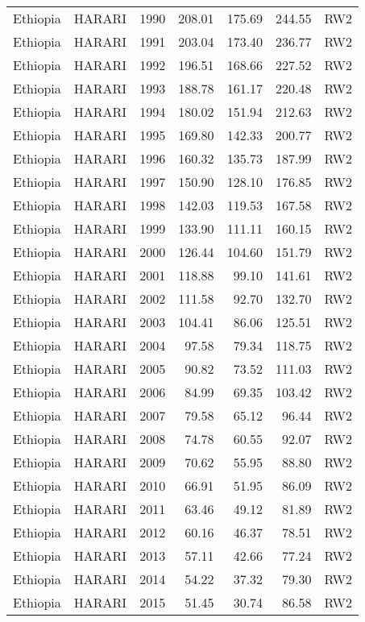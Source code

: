 \begin{longtable}{lllrrrl}
  Ethiopia & HARARI & 1990 & 208.01 & 175.69 & 244.55 & RW2 \\ 
  Ethiopia & HARARI & 1991 & 203.04 & 173.40 & 236.77 & RW2 \\ 
  Ethiopia & HARARI & 1992 & 196.51 & 168.66 & 227.52 & RW2 \\ 
  Ethiopia & HARARI & 1993 & 188.78 & 161.17 & 220.48 & RW2 \\ 
  Ethiopia & HARARI & 1994 & 180.02 & 151.94 & 212.63 & RW2 \\ 
  Ethiopia & HARARI & 1995 & 169.80 & 142.33 & 200.77 & RW2 \\ 
  Ethiopia & HARARI & 1996 & 160.32 & 135.73 & 187.99 & RW2 \\ 
  Ethiopia & HARARI & 1997 & 150.90 & 128.10 & 176.85 & RW2 \\ 
  Ethiopia & HARARI & 1998 & 142.03 & 119.53 & 167.58 & RW2 \\ 
  Ethiopia & HARARI & 1999 & 133.90 & 111.11 & 160.15 & RW2 \\ 
  Ethiopia & HARARI & 2000 & 126.44 & 104.60 & 151.79 & RW2 \\ 
  Ethiopia & HARARI & 2001 & 118.88 & 99.10 & 141.61 & RW2 \\ 
  Ethiopia & HARARI & 2002 & 111.58 & 92.70 & 132.70 & RW2 \\ 
  Ethiopia & HARARI & 2003 & 104.41 & 86.06 & 125.51 & RW2 \\ 
  Ethiopia & HARARI & 2004 & 97.58 & 79.34 & 118.75 & RW2 \\ 
  Ethiopia & HARARI & 2005 & 90.82 & 73.52 & 111.03 & RW2 \\ 
  Ethiopia & HARARI & 2006 & 84.99 & 69.35 & 103.42 & RW2 \\ 
  Ethiopia & HARARI & 2007 & 79.58 & 65.12 & 96.44 & RW2 \\ 
  Ethiopia & HARARI & 2008 & 74.78 & 60.55 & 92.07 & RW2 \\ 
  Ethiopia & HARARI & 2009 & 70.62 & 55.95 & 88.80 & RW2 \\ 
  Ethiopia & HARARI & 2010 & 66.91 & 51.95 & 86.09 & RW2 \\ 
  Ethiopia & HARARI & 2011 & 63.46 & 49.12 & 81.89 & RW2 \\ 
  Ethiopia & HARARI & 2012 & 60.16 & 46.37 & 78.51 & RW2 \\ 
  Ethiopia & HARARI & 2013 & 57.11 & 42.66 & 77.24 & RW2 \\ 
  Ethiopia & HARARI & 2014 & 54.22 & 37.32 & 79.30 & RW2 \\ 
  Ethiopia & HARARI & 2015 & 51.45 & 30.74 & 86.58 & RW2 \\ 

\end{longtable}
